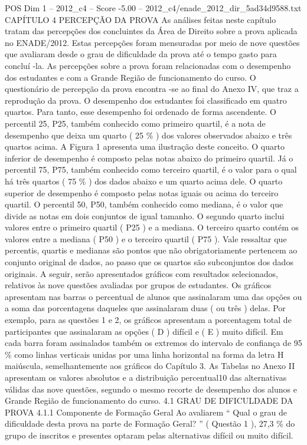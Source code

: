 \begin{textsample}{POS Dim 1 – 2012\_c4 – Score -5.00 – 2012\_c4/enade\_2012\_dir\_5ad34d9588.txt}  \label{ex:f1_pos_368}
CAPÍTULO 4 PERCEPÇÃO DA PROVA As análises feitas neste capítulo tratam das percepções dos concluintes da Área de Direito sobre a prova aplicada no ENADE/2012.
Estas percepções foram mensuradas por meio de nove questões que avaliaram desde o grau de dificuldade da prova até o tempo gasto para concluí -la.
As percepções sobre a prova foram relacionadas com o desempenho dos estudantes e com a Grande Região de funcionamento do curso.
O questionário de percepção da prova encontra -se ao final do Anexo IV, que traz a reprodução da prova.
O desempenho dos estudantes foi classificado em quatro quartos.
Para tanto, esse desempenho foi ordenado de forma ascendente.
O percentil 25, P25, também conhecido como primeiro quartil, é a nota de desempenho que deixa um quarto ( 25 \% ) dos valores observados abaixo e três quartos acima.
A Figura 1 apresenta uma ilustração deste conceito.
O quarto inferior de desempenho é composto pelas notas abaixo do primeiro quartil.
Já o percentil 75, P75, também conhecido como terceiro quartil, é o valor para o qual há três quartos ( 75 \% ) dos dados abaixo e um quarto acima dele.
O quarto superior de desempenho é composto pelas notas iguais ou acima do terceiro quartil.
O percentil 50, P50, também conhecido como mediana, é o valor que divide as notas em dois conjuntos de igual tamanho.
O segundo quarto inclui valores entre o primeiro quartil ( P25 ) e a mediana.
O terceiro quarto contém os valores entre a mediana ( P50 ) e o terceiro quartil ( P75 ).
Vale ressaltar que percentis, quartis e medianas são pontos que não obrigatoriamente pertencem ao conjunto original de dados, ao passo que os quartos são subconjuntos dos dados originais.
A seguir, serão apresentados gráficos com resultados selecionados, relativos às nove questões avaliadas por grupos de estudantes.
Os gráficos apresentam nas barras o percentual de alunos que assinalaram uma das opções ou a soma das porcentagens daqueles que assinalaram duas ( ou três ) delas.
Por exemplo, para as questões 1 e 2, os gráficos apresentam a porcentagem total de participantes que assinalaram as opções ( D ) difícil e ( E ) muito difícil.
Em cada barra foram assinalados também os extremos do intervalo de confiança de 95 \% como linhas verticais unidas por uma linha horizontal na forma da letra H maiúscula, semelhantemente aos gráficos do Capítulo 3.
As Tabelas no Anexo II apresentam os valores absolutos e a distribuição percentual10 das alternativas válidas das nove questões, segundo o mesmo recorte de desempenho dos alunos e Grande Região de funcionamento do curso. 4.1 GRAU DE DIFICULDADE DA PROVA 4.1.1 Componente de Formação Geral Ao avaliarem “ Qual o grau de dificuldade desta prova na parte de Formação Geral? ” ( Questão 1 ), 27,3 \% do grupo de inscritos e presentes optaram pelas alternativas difícil ou muito difícil.

\end{textsample}
